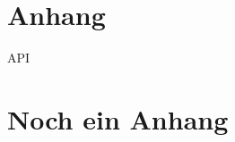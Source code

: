 \appendix
\section{Anhang} %
\label{sec:anhang}
\ac{API}


\section{Noch ein Anhang} %
\label{sec:noch_ein_anhang}

